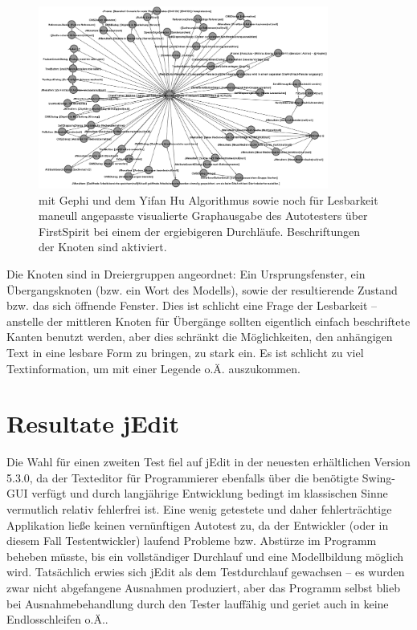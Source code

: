 \begin{figure}
	\centering
	\includegraphics[width=0.85\textwidth]{bilder/model_freespirit.png}
	\caption{mit Gephi und dem Yifan Hu Algorithmus \cite{hu2005efficient}
    sowie noch für Lesbarkeit maneull angepasste visualierte Graphausgabe 
	des Autotesters über FirstSpirit bei einem der ergiebigeren Durchläufe.
	Beschriftungen der Knoten sind aktiviert.}
	\label{fig:model_freespirit_06.10.2015}
\end{figure}



Die Knoten sind in Dreiergruppen angeordnet: Ein Ursprungsfenster, ein Übergangsknoten
(bzw. ein Wort des Modells), sowie der resultierende Zustand bzw. das sich öffnende Fenster.
Dies ist schlicht eine Frage der Lesbarkeit -- anstelle der mittleren Knoten für Übergänge sollten
eigentlich einfach beschriftete Kanten benutzt werden, aber dies schränkt die Möglichkeiten,
den anhängigen Text in eine lesbare Form zu bringen, zu stark ein. Es ist schlicht zu viel
Textinformation, um mit einer Legende o.Ä. auszukommen.


\section{Resultate jEdit}\label{section:testresultsjedit}

Die Wahl für einen zweiten Test fiel auf jEdit
in der neuesten erhältlichen Version 5.3.0,
da der \glqq{}Texteditor für Programmierer\grqq{}
ebenfalls über die benötigte Swing-GUI verfügt und 
durch langjährige Entwicklung bedingt im klassischen
Sinne vermutlich relativ fehlerfrei ist. Eine wenig getestete und daher fehlerträchtige
Applikation ließe keinen vernünftigen Autotest zu, da der Entwickler (oder in diesem Fall
Testentwickler) laufend Probleme bzw. Abstürze im Programm beheben müsste, bis ein vollständiger
Durchlauf und eine Modellbildung möglich wird. Tatsächlich erwies sich jEdit als
dem Testdurchlauf gewachsen -- es wurden zwar nicht abgefangene Ausnahmen produziert,
aber das Programm selbst blieb bei Ausnahmebehandlung durch den Tester lauffähig
und geriet auch in keine Endlosschleifen o.Ä..


